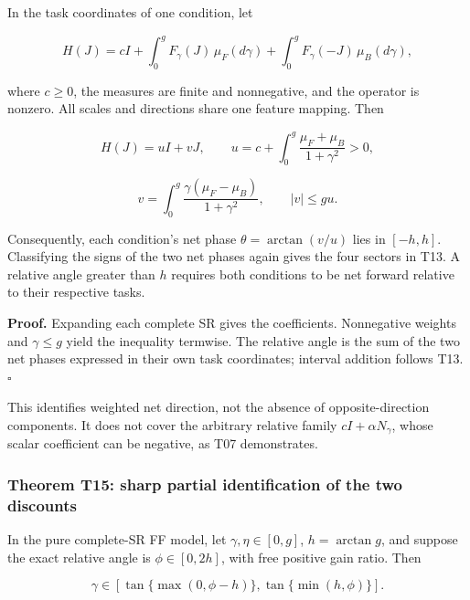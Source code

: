 \documentclass[11pt,a4paper]{article}
\begin{document}
\par
\noindent\begin{minipage}{\linewidth}

In the task coordinates of one condition, let

\[
H(J)=cI+\int_0^gF_\gamma(J)\,\mu_F(d\gamma)
+\int_0^gF_\gamma(-J)\,\mu_B(d\gamma),
\]

\end{minipage}\par

\par
\noindent\begin{minipage}{\linewidth}

where \(c\ge0\), the measures are finite and nonnegative, and the
operator is nonzero. All scales and directions share one feature
mapping. Then

\[
H(J)=uI+vJ,\qquad
u=c+\int_0^g\frac{\mu_F+\mu_B}{1+\gamma^2}>0,
\]

\end{minipage}\par

\[
v=\int_0^g\frac{\gamma(\mu_F-\mu_B)}{1+\gamma^2},
\qquad |v|\le gu.
\]

Consequently, each condition's net phase \(\theta=\arctan(v/u)\) lies in
\([-h,h]\). Classifying the signs of the two net phases again gives the
four sectors in T13. A relative angle greater than \(h\) requires both
conditions to be net forward relative to their respective tasks.

\textbf{Proof.} Expanding each complete SR gives the coefficients.
Nonnegative weights and \(\gamma\le g\) yield the inequality termwise.
The relative angle is the sum of the two net phases expressed in their
own task coordinates; interval addition follows T13. \(\square\)

This identifies weighted net direction, not the absence of
opposite-direction components. It does not cover the arbitrary relative
family \(cI+\alpha N_\gamma\), whose scalar coefficient can be negative,
as T07 demonstrates.

\subsubsection{Theorem T15: sharp partial identification of the two
discounts}\label{theorem-t15-sharp-partial-identification-of-the-two-discounts}

\par
\noindent\begin{minipage}{\linewidth}

In the pure complete-SR FF model, let \(\gamma,\eta\in[0,g]\),
\(h=\arctan g\), and suppose the exact relative angle is
\(\phi\in[0,2h]\), with free positive gain ratio. Then

\[
\gamma\in
\left[
\tan\{\max(0,\phi-h)\},
\tan\{\min(h,\phi)\}
\right].
\]

\end{minipage}\par
\end{document}
